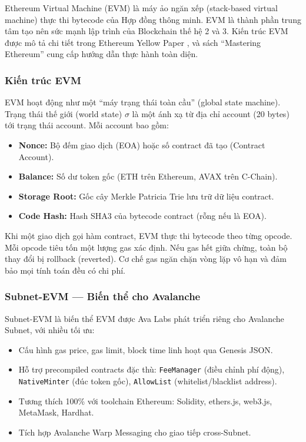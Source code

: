 Ethereum Virtual Machine (EVM) \cite{wood2014ethereum} là máy ảo ngăn xếp (stack-based virtual machine) thực thi bytecode của Hợp đồng thông minh. EVM là thành phần trung tâm tạo nên sức mạnh lập trình của Blockchain thế hệ 2 và 3. Kiến trúc EVM được mô tả chi tiết trong Ethereum Yellow Paper \cite{wood2014ethereum}, và sách ``Mastering Ethereum'' \cite{antonopoulos2018mastering} cung cấp hướng dẫn thực hành toàn diện.

\subsubsection{Kiến trúc EVM}

EVM hoạt động như một ``máy trạng thái toàn cầu'' (global state machine). Trạng thái thế giới (world state) $\sigma$ là một ánh xạ từ địa chỉ account (20 bytes) tới trạng thái account. Mỗi account bao gồm:
\begin{itemize}
    \item \textbf{Nonce:} Bộ đếm giao dịch (EOA) hoặc số contract đã tạo (Contract Account).
    \item \textbf{Balance:} Số dư token gốc (ETH trên Ethereum, AVAX trên C-Chain).
    \item \textbf{Storage Root:} Gốc cây Merkle Patricia Trie lưu trữ dữ liệu contract.
    \item \textbf{Code Hash:} Hash SHA3 của bytecode contract (rỗng nếu là EOA).
\end{itemize}

Khi một giao dịch gọi hàm contract, EVM thực thi bytecode theo từng opcode. Mỗi opcode tiêu tốn một lượng gas xác định. Nếu gas hết giữa chừng, toàn bộ thay đổi bị rollback (reverted). Cơ chế gas ngăn chặn vòng lặp vô hạn và đảm bảo mọi tính toán đều có chi phí.

\subsubsection{Subnet-EVM --- Biến thể cho Avalanche}

Subnet-EVM là biến thể EVM được Ava Labs phát triển riêng cho Avalanche Subnet, với nhiều tối ưu:
\begin{itemize}
    \item Cấu hình gas price, gas limit, block time linh hoạt qua Genesis JSON.
    \item Hỗ trợ precompiled contracts đặc thù: \texttt{FeeManager} (điều chỉnh phí động), \texttt{NativeMinter} (đúc token gốc), \texttt{AllowList} (whitelist/blacklist address).
    \item Tương thích 100\% với toolchain Ethereum: Solidity, ethers.js, web3.js, MetaMask, Hardhat.
    \item Tích hợp Avalanche Warp Messaging cho giao tiếp cross-Subnet.
\end{itemize}


